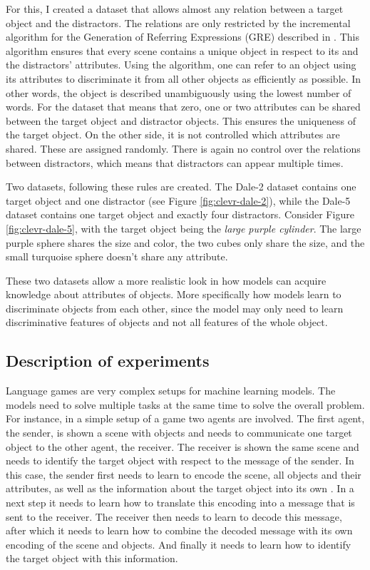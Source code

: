 For this, I created a dataset that allows almost any relation between a target object and the distractors.
The relations are only restricted by the incremental algorithm for the Generation of Referring Expressions (GRE) described in \citet{Dale1995}.
This algorithm ensures that every scene contains a unique object in respect to its and the distractors' attributes.
Using the algorithm, one can refer to an object using its attributes to discriminate it from all other objects as efficiently as possible.
In other words, the object is described unambiguously using the lowest number of words.
For the dataset that means that zero, one or two attributes can be shared between the target object and distractor objects.
This ensures the uniqueness of the target object.
On the other side, it is not controlled which attributes are shared.
These are assigned randomly.
There is again no control over the relations between distractors, which means that distractors can appear multiple times.

Two datasets, following these rules are created.
The Dale-2 dataset contains one target object and one distractor (see Figure \ref{fig:clevr-dale-2}), while the Dale-5 dataset contains one target object and exactly four distractors.
Consider Figure \ref{fig:clevr-dale-5}, with the target object being the \emph{large purple cylinder}. The large purple sphere shares the size and color, the two cubes only share the size, and the small turquoise sphere doesn't share any attribute.

These two datasets allow a more realistic look in how models can acquire knowledge about attributes of objects.
More specifically how models learn to discriminate objects from each other, since the model may only need to learn discriminative features of objects and not all features of the whole object.


\subsection{Description of experiments}
Language games are very complex setups for machine learning models.
The models need to solve multiple tasks at the same time to solve the overall problem.
For instance, in a simple setup of a game two agents are involved.
The first agent, the sender, is shown a scene with objects and needs to communicate one target object to the other agent, the receiver.
The receiver is shown the same scene and needs to identify the target object with respect to the message of the sender.
In this case, the sender first needs to learn to encode the scene, all objects and their attributes, as well as the information about the target object into its own .
In a next step it needs to learn how to translate this encoding into a message that is sent to the receiver.
The receiver then needs to learn to decode this message, after which it needs to learn how to combine the decoded message with its own encoding of the scene and objects.
And finally it needs to learn how to identify the target object with this information.

